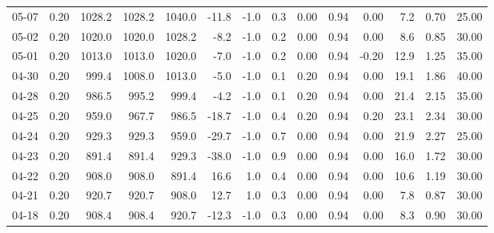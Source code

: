 \begin{threeparttable}
{\begin{tabular}{lrrrrrrrrrrrrr}
  05-07 &     0.20 & 1028.2 & 1028.2 & 1040.0 &      -11.8 &                     -1.0 &                 0.3 &       0.00 &      0.94 &           0.00 &              7.2 &            0.70 &                  25.00 \\
  05-02 &     0.20 & 1020.0 & 1020.0 & 1028.2 &       -8.2 &                     -1.0 &                 0.2 &       0.00 &      0.94 &           0.00 &              8.6 &            0.85 &                  30.00 \\
  05-01 &     0.20 & 1013.0 & 1013.0 & 1020.0 &       -7.0 &                     -1.0 &                 0.2 &       0.00 &      0.94 &          -0.20 &             12.9 &            1.25 &                  35.00 \\
  04-30 &     0.20 &  999.4 & 1008.0 & 1013.0 &       -5.0 &                     -1.0 &                 0.1 &       0.20 &      0.94 &           0.00 &             19.1 &            1.86 &                  40.00 \\
  04-28 &     0.20 &  986.5 &  995.2 &  999.4 &       -4.2 &                     -1.0 &                 0.1 &       0.20 &      0.94 &           0.00 &             21.4 &            2.15 &                  35.00 \\
  04-25 &     0.20 &  959.0 &  967.7 &  986.5 &      -18.7 &                     -1.0 &                 0.4 &       0.20 &      0.94 &           0.20 &             23.1 &            2.34 &                  30.00 \\
  04-24 &     0.20 &  929.3 &  929.3 &  959.0 &      -29.7 &                     -1.0 &                 0.7 &       0.00 &      0.94 &           0.00 &             21.9 &            2.27 &                  25.00 \\
  04-23 &     0.20 &  891.4 &  891.4 &  929.3 &      -38.0 &                     -1.0 &                 0.9 &       0.00 &      0.94 &           0.00 &             16.0 &            1.72 &                  30.00 \\
  04-22 &     0.20 &  908.0 &  908.0 &  891.4 &       16.6 &                      1.0 &                 0.4 &       0.00 &      0.94 &           0.00 &             10.6 &            1.19 &                  30.00 \\
  04-21 &     0.20 &  920.7 &  920.7 &  908.0 &       12.7 &                      1.0 &                 0.3 &       0.00 &      0.94 &           0.00 &              7.8 &            0.87 &                  30.00 \\
  04-18 &     0.20 &  908.4 &  908.4 &  920.7 &      -12.3 &                     -1.0 &                 0.3 &       0.00 &      0.94 &           0.00 &              8.3 &            0.90 &                  30.00 \\

\end{tabular}}
\end{threeparttable}
